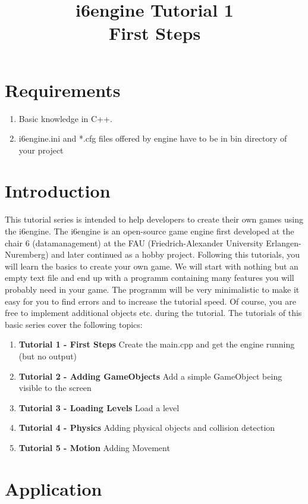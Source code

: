 \documentclass{article}
\title{i6engine Tutorial 1 \\ First Steps}
\begin{document}
\section{Requirements}


\begin{enumerate}
\item Basic knowledge in C++.
\item i6engine.ini and *.cfg files offered by engine have to be in bin directory of your project
\end{enumerate}

\section{Introduction}

This tutorial series is intended to help developers to create their own games using the i6engine. The i6engine is an open-source game engine first developed at the chair 6 (datamanagement) at the FAU (Friedrich-Alexander University Erlangen-Nuremberg) and later continued as a hobby project.\newline
Following this tutorials, you will learn the basics to create your own game. We will start with nothing but an empty text file and end up with a programm containing many features you will probably need in your game. The programm will be very minimalistic to make it easy for you to find errors and to increase the tutorial speed. Of course, you are free to implement additional objects etc. during the tutorial.\newline
The tutorials of this basic series cover the following topics:\newline
\begin{enumerate}
\item \textbf{Tutorial 1 - First Steps} Create the main.cpp and get the engine running (but no output)
\item \textbf{Tutorial 2 - Adding GameObjects} Add a simple GameObject being visible to the screen
\item \textbf{Tutorial 3 - Loading Levels} Load a level
\item \textbf{Tutorial 4 - Physics} Adding physical objects and collision detection
\item \textbf{Tutorial 5 - Motion} Adding Movement
\end{enumerate}

\section{Application}
\end{document}
